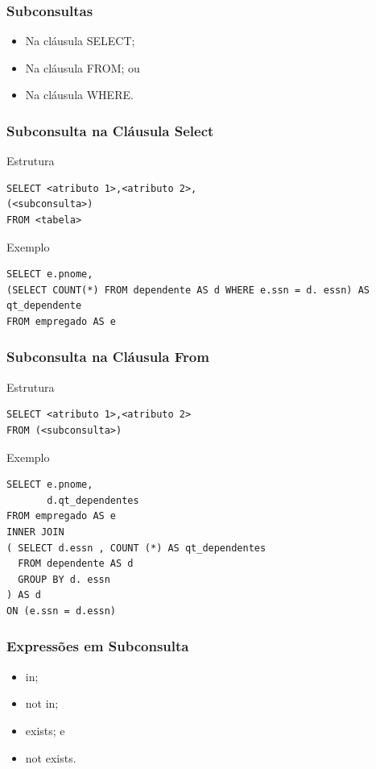 \documentclass{beamer}
\begin{document}
\begin{frame}
\frametitle{Subconsultas}

\begin{itemize}
	\item Na cláusula SELECT;
	\item Na cláusula FROM; ou
	\item Na cláusula WHERE.
\end{itemize}
\end{frame}

\begin{frame}[fragile]
\frametitle{Subconsulta na Cláusula Select}

\begin{block}{Estrutura}
	\begin{lstlisting}
SELECT <atributo 1>,<atributo 2>,
(<subconsulta>)
FROM <tabela>	
	\end{lstlisting}
\end{block}\vfill

\begin{exampleblock}{Exemplo}
	\begin{lstlisting}
SELECT e.pnome,
(SELECT COUNT(*) FROM dependente AS d WHERE e.ssn = d. essn) AS qt_dependente
FROM empregado AS e	
	\end{lstlisting}
\end{exampleblock}
\end{frame}

\begin{frame}[fragile]
\frametitle{Subconsulta na Cláusula From}

\begin{block}{Estrutura}
	\begin{lstlisting}
SELECT <atributo 1>,<atributo 2>
FROM (<subconsulta>)	
	\end{lstlisting}
\end{block}\vfill

\begin{exampleblock}{Exemplo}
	\begin{lstlisting}
SELECT e.pnome,
       d.qt_dependentes
FROM empregado AS e
INNER JOIN 
( SELECT d.essn , COUNT (*) AS qt_dependentes
  FROM dependente AS d
  GROUP BY d. essn
) AS d
ON (e.ssn = d.essn)
	\end{lstlisting}
\end{exampleblock}
\end{frame}

\begin{frame}
\frametitle{Expressões em Subconsulta}

\begin{itemize}
	\item in;
	\item not in;
	\item exists; e
	\item not exists.
\end{itemize}
\end{frame}
\end{document}
